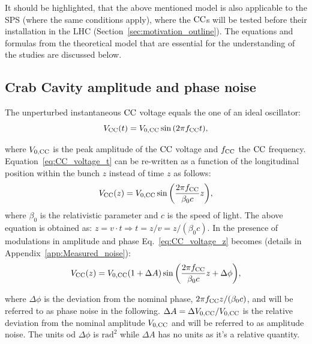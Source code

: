 It should be highlighted, that the above mentioned model is also applicable to the SPS (where the same conditions apply), where the ${\mathrm{CC}}$s will be tested before their installation in the LHC (Section~\ref{sec:motivation_outline}). The equations and formulas from the theoretical model that are essential for the understanding of the studies are discussed below.


\subsection{Crab Cavity amplitude and phase noise}\label{subsec:AN_PN}
The unperturbed instantaneous ${\mathrm{CC}}$ voltage equals the one of an ideal oscillator:
\begin{equation}\label{eq:CC_voltage_t}
    V_\mathrm{CC}(t) = {V_\mathrm{0, CC}} \sin{\left ( 2 \pi {f_\mathrm{CC}}t \right )},
\end{equation}

where ${V_\mathrm{0, CC}}$ is the peak amplitude of the ${\mathrm{CC}}$ voltage and ${f_\mathrm{CC}}$ the ${\mathrm{CC}}$ frequency. Equation~\eqref{eq:CC_voltage_t} can be re-written as a function of the longitudinal position within the bunch $z$ instead of time $z$ as follows:
\begin{equation}\label{eq:CC_voltage_z}
    V_\mathrm{CC}(z) = {V_\mathrm{0, CC}} \sin{\left ( \frac{2\pi {f_\mathrm{CC}}}{\beta_0 c}z \right )},
\end{equation}
where $\beta_0$ is the relativistic parameter and $c$ is the speed of light. The above equation is obtained as: $z=v \cdot t \Rightarrow t=z/v=z/(\beta_0 c)$.
In the presence of modulations in amplitude and phase Eq.~\eqref{eq:CC_voltage_z} becomes (details in Appendix~\ref{app:Measured_noise}):
\begin{equation}\label{eq:CC_voltage_z}
    V_\mathrm{CC}(z) = {V_\mathrm{0, CC}} (1+\Delta A) \sin{\left ( \frac{2\pi {f_\mathrm{CC}}}{\beta_0 c}z + \Delta \phi \right )},
\end{equation}

where $\Delta \phi$ is the deviation from the nominal phase, $2\pi {f_\mathrm{CC}} z/(\beta_0 c)$, and will be referred to as phase noise in the following. $\Delta A = \Delta {V_\mathrm{0, CC}} / {V_\mathrm{0, CC}}$ is the relative deviation from the nominal amplitude ${V_\mathrm{0, CC}}$ and will be referred to as amplitude noise. The units od $\Delta \phi$ is $\mathrm{rad^2}$ while $\Delta A$ has no units as it's a relative quantity.


